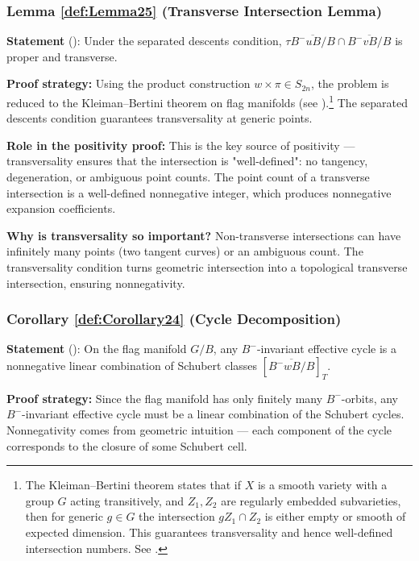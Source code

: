 \subsubsection{Lemma \cref{def:Lemma25} (Transverse Intersection Lemma)}
\label{sec:Lemma25Detail}

\textbf{Statement} (\cite[ Lemma 2.5]{GX2025}): Under the separated descents condition, $\tau\overline{B^-uB/B} \cap \overline{B^-vB/B}$ is proper and transverse.\ 

\textbf{Proof strategy:} Using the product construction $w \times \pi \in S_{2n}$, the problem is reduced to the Kleiman--Bertini theorem on flag manifolds (see \cite[Section 19.3]{AndersonFulton}).\footnote{The Kleiman--Bertini theorem states that if $X$ is a smooth variety with a group $G$ acting transitively, and $Z_1, Z_2$ are regularly embedded subvarieties, then for generic $g \in G$ the intersection $gZ_1 \cap Z_2$ is either empty or smooth of expected dimension. This guarantees transversality and hence well-defined intersection numbers. See \cite[Chapter 19]{AndersonFulton}.} The separated descents condition guarantees transversality at generic points.\ 

\textbf{Role in the positivity proof:} This is the key source of positivity --- transversality ensures that the intersection is "well-defined": no tangency, degeneration, or ambiguous point counts. The point count of a transverse intersection is a well-defined nonnegative integer, which produces nonnegative expansion coefficients.\ 

\textbf{Why is transversality so important?} Non-transverse intersections can have infinitely many points (two tangent curves) or an ambiguous count. The transversality condition turns geometric intersection into a topological transverse intersection, ensuring nonnegativity.\ 

\subsubsection{Corollary \cref{def:Corollary24} (Cycle Decomposition)}
\label{sec:Corollary24Detail}

\textbf{Statement} (\cite[ Corollary 2.4]{GX2025}): On the flag manifold $G/B$, any $B^-$-invariant effective cycle is a nonnegative linear combination of Schubert classes $[\overline{B^-wB/B}]_T$.\ 

\textbf{Proof strategy:} Since the flag manifold has only finitely many $B^-$-orbits, any $B^-$-invariant effective cycle must be a linear combination of the Schubert cycles. Nonnegativity comes from geometric intuition --- each component of the cycle corresponds to the closure of some Schubert cell.\ 


